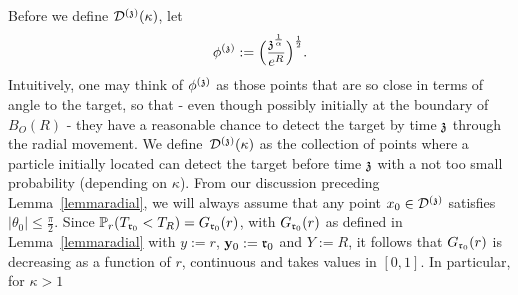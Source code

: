 \medskip
Before we define $\dt(\kappa)$, let
\[
\phi^{(\ss)}:=\Big(\frac{\ss^{\frac{1}{\alpha}}}{e^{R}}\Big)^{\frac{1}{2}}.%
\] 
Intuitively, one may think of $\phi^{(\ss)}$ as those points that are so close in terms of angle to the target, so that - even though possibly initially at the boundary of $B_O(R)$ - they have a reasonable chance to detect the target by time $\ss$ through the radial movement. %
We define~$\dt(\kappa)$ as the collection of points where a particle initially located can detect the target before time $\ss$ with a not too small probability (depending on $\kappa$). From our discussion preceding Lemma~\ref{lemmaradial}, we will always assume that any point $x_0\in\dt$ satisfies $|\theta_0|\leq\frac{\pi}{2}$. Since $\PP_{r}(T_{\rabs_0}<T_R)=G_{\rabs_0}(r)$, with $G_{\rabs_0}(r)$ as defined in Lemma~\ref{lemmaradial} with $y:=r$, $\yabs_0:=\rabs_0$ and $Y:=R$, it follows that $G_{\rabs_0}(r)$ is decreasing as a function of $r$, continuous and takes values in $[0,1]$. In particular, for $\kappa>1$ 
